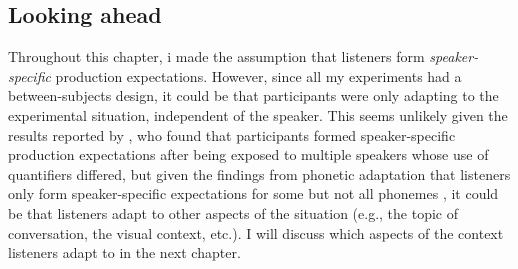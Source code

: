 \subsection{Looking ahead}



Throughout this chapter, i made the assumption that listeners  form \textit{speaker-specific} production expectations. However,
since all my experiments had a between-subjects design, it could be that participants were only adapting to the experimental
situation, independent of the speaker. This seems unlikely given the results reported by \textcite{Yildirim2016}, who found that
participants formed speaker-specific production expectations after being exposed to multiple speakers whose use of
quantifiers differed, but given the findings from phonetic adaptation that listeners only form speaker-specific expectations
for some but not all phonemes \cite{Kraljic2006}, it could be that listeners adapt to other aspects of the situation (e.g., the topic of conversation, the visual context, etc.).
I will discuss which aspects of the context listeners adapt to in the next chapter.

